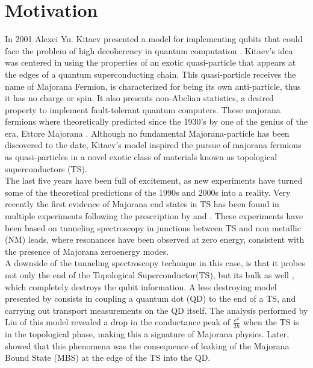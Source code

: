 \chapter{Motivation}

In 2001 Alexei Yu. Kitaev presented a model for implementing qubits
that could face the problem of high decoherency in quantum computation \citep{kitaev_unpaired_2001}.
Kitaev's idea was centered in using the properties of an exotic quasi-particle
that appears at the edges of a quantum superconducting chain. This
quasi-particle receives the name of Majorana Fermion, is characterized
for being its own anti-particle, thus it has no charge or spin. It also
presents non-Abelian statistics, a desired property to implement fault-tolerant
quantum computers\citep{kitaev_fault-tolerant_2003}. These majorana
fermions where theoretically predicted since the 1930's by one of
the genius of the era, Ettore Majorana \citep{wilczek_majorana_2009}.
Although no fundamental Majorana-particle has been discovered to the
date, Kitaev's model inspired the pursue of majorana fermions as
quasi-particles in a novel exotic class of materials known as topological
superconductors (TS)\citep{fu_superconducting_2008,sato_non-abelian_2009,alicea_new_2012}.
\\

The last five years have been full of excitement, as new experiments
have turned some of the theoretical predictions of the 1990s and 2000s
into a reality. Very recently the first evidence of Majorana end states
in TS has been found in multiple experiments \citep{mourik_signatures_2012,das_zero-bias_2012,deng_anomalous_2012}
following the prescription by \citet{oreg_helical_2010} and \citet{lutchyn_majorana_2010}.
These experiments have been based on tunneling spectroscopy in junctions
between TS and non metallic (NM) leads, where resonances have been
observed at zero energy, consistent with the presence of Majorana
zero\textendash energy modes.\\

A downside of the tunneling spectroscopy technique in this case, is
that it probes not only the end of the Topological Superconductor(TS), but its bulk as well ,
which completely destroys the qubit information. A less destroying
model presented by \citet{liu_detecting_2011} consists in coupling
a quantum dot (QD) to the end of a TS, and carrying out transport
measurements on the QD itself. The analysis performed by Liu of this
model revealed a drop in the conductance peak of $\frac{e^{2}}{2h}$
when the TS is in the topological phase, making this a signature of
Majorana physics. Later, \citet{vernek_subtle_2014} showed that this
phenomena was the consequence of leaking of the Majorana Bound State
(MBS) at the edge of the TS into the QD. \\

